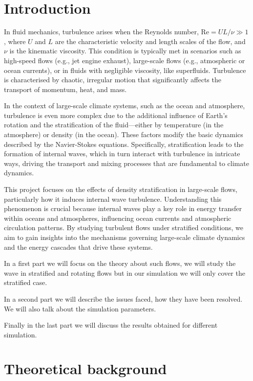 \documentclass[final,5p,times,twocolumn,authoryear]{elsarticle}
\begin{document}
\section{Introduction}
\label{introduction}

In fluid mechanics, turbulence arises when the Reynolds number, $\mathrm{Re} = UL/\nu \gg 1$, where $U$ and $L$ are the characteristic velocity and length scales of the flow, and $\nu$ is the kinematic viscosity. This condition is typically met in scenarios such as high-speed flows (e.g., jet engine exhaust), large-scale flows (e.g., atmospheric or ocean currents), or in fluids with negligible viscosity, like superfluids. Turbulence is characterised by chaotic, irregular motion that significantly affects the transport of momentum, heat, and mass.

In the context of large-scale climate systems, such as the ocean and atmosphere, turbulence is even more complex due to the additional influence of Earth’s rotation and the stratification of the fluid—either by temperature (in the atmosphere) or density (in the ocean). These factors modify the basic dynamics described by the Navier-Stokes equations. Specifically, stratification leads to the formation of internal waves, which in turn interact with turbulence in intricate ways, driving the transport and mixing processes that are fundamental to climate dynamics.

This project focuses on the effects of density stratification in large-scale flows, particularly how it induces internal wave turbulence. Understanding this phenomenon is crucial because internal waves play a key role in energy transfer within oceans and atmospheres, influencing ocean currents and atmospheric circulation patterns. By studying turbulent flows under stratified conditions, we aim to gain insights into the mechanisms governing large-scale climate dynamics and the energy cascades that drive these systems.

In a first part we will focus on the theory about such flows, we will study the wave in stratified and rotating flows but in our simulation we will only cover the stratified case.

In a second part we will describe the issues faced, how they have been resolved. We will also talk about the simulation parameters.

Finally in the last part we will discuss the results obtained for different simulation. 

\section{Theoretical background}
\end{document}
